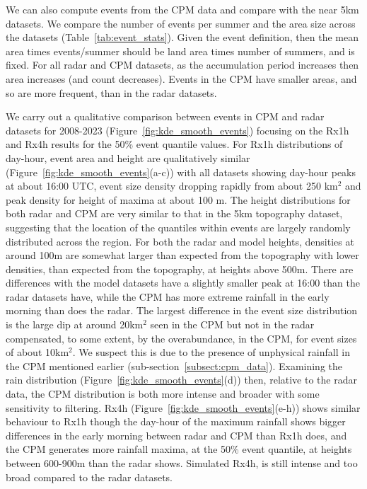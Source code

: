 \documentclass[11pt,a4paper]{article}
\begin{document}
 We can also compute events from the CPM data and compare with the near 5km datasets. We compare the number of events per summer and the area size across the datasets (Table~\ref{tab:event_stats}). Given the event definition, then the mean area times events/summer should be land area times number of summers, and is fixed. For all radar and CPM datasets, as the accumulation period increases then area increases (and count decreases). Events in the CPM have smaller areas, and so are more frequent, than in the radar datasets. 
 
  We carry out a qualitative comparison between events in  CPM and radar datasets for 2008-2023 (Figure~\ref{fig:kde_smooth_events}) focusing on the Rx1h and Rx4h results for the 50\% event quantile values. 
  For Rx1h distributions of day-hour, event area and height are qualitatively similar  (Figure~\ref{fig:kde_smooth_events}(a-c)) with all datasets showing day-hour peaks at about 16:00 UTC, event size density dropping rapidly from about 250 km$^2$ and peak density for height of maxima at about 100 m.
   The height distributions for both radar and CPM are very similar to that in the 5km topography dataset, suggesting that the location of the quantiles within events are largely  randomly distributed across the region. 
    For both the radar and model heights, densities  at around 100m are somewhat larger than expected from the topography with lower densities, than expected from the topography, at heights above 500m. 
    There are differences with the model datasets have a slightly smaller peak at 16:00 than the radar datasets have, while the CPM has more extreme rainfall in the early morning than does the radar. The largest difference in the event size distribution is the large dip at around 20km$^2$ seen in the CPM but not in the radar compensated, to some extent, by the overabundance, in the CPM, for event sizes of about 10km$^2$. We suspect this is due to the presence of unphysical rainfall in the CPM mentioned earlier (sub-section~\ref{subsect:cpm_data}). 
     Examining the rain distribution (Figure~\ref{fig:kde_smooth_events}(d)) then, relative to the radar data, the CPM distribution is both more intense and broader with some sensitivity to filtering.  Rx4h (Figure~\ref{fig:kde_smooth_events}(e-h)) shows similar behaviour to Rx1h though the day-hour of the maximum rainfall shows bigger differences in the early morning between radar and CPM than Rx1h does, and the CPM generates more rainfall maxima, at the 50\% event quantile,  at heights  between 600-900m than the radar shows.  Simulated Rx4h, is still intense and too broad compared to the radar datasets. 
\end{document}

